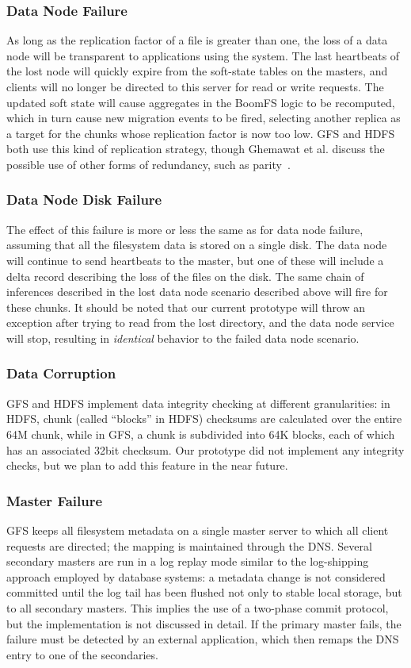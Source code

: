 \documentclass[twocolumn]{article}
\begin{document}
\subsubsection{Data Node Failure}
As long as the replication factor of a file is greater than one, the
loss of a data node will be transparent to applications using the
system.  The last heartbeats of the lost node will quickly expire from
the soft-state tables on the masters, and clients will no longer be
directed to this server for read or write requests.  The updated soft
state will cause aggregates in the BoomFS logic to be recomputed, which
in turn cause new migration events to be fired, selecting another
replica as a target for the chunks whose replication factor is now too
low.  GFS and HDFS both use this kind of replication strategy, though
Ghemawat et al. discuss the possible use of other forms of redundancy,
such as parity~\cite{gfs}.

\subsubsection{Data Node Disk Failure}
The effect of this failure is more or less the same as for data node
failure, assuming that all the filesystem data is stored on a single
disk.  The data node will continue to send heartbeats to the master,
but one of these will include a delta record describing the loss of
the files on the disk.  The same chain of inferences described in the
lost data node scenario described above will fire for these chunks.
It should be noted that our current prototype will throw an exception
after trying to read from the lost directory, and the data node
service will stop, resulting in \emph{identical} behavior to the
failed data node scenario.

\subsubsection{Data Corruption}
GFS and HDFS implement data integrity checking at different
granularities: in HDFS, chunk (called ``blocks'' in HDFS) checksums
are calculated over the entire 64M chunk, while in GFS, a chunk is
subdivided into 64K blocks, each of which has an associated 32bit
checksum.  Our prototype did not implement any integrity checks, but
we plan to add this feature in the near future.

\subsubsection{Master Failure}
GFS keeps all filesystem metadata on a single master server to which
all client requests are directed; the mapping is maintained through
the DNS.  Several secondary masters are run in a log replay mode
similar to the log-shipping approach employed by database systems: a
metadata change is not considered committed until the log tail has
been flushed not only to stable local storage, but to all secondary
masters.  This implies the use of a two-phase commit protocol, but the
implementation is not discussed in detail.  If the primary master
fails, the failure must be detected by an external application, which
then remaps the DNS entry to one of the secondaries.
 
\end{document}
